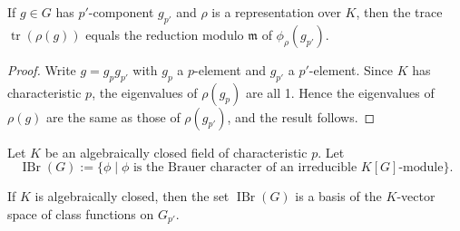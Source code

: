 \begin{lemma}\label{tr_Bcha}
If \(g \in G\) has \(p'\)-component \(g_{p'}\) and \(\rho\) is a representation over \(K\), then the trace \(\operatorname{tr}(\rho(g))\) equals the reduction modulo \(\mathfrak{m}\) of \(\phi_\rho(g_{p'})\).
\end{lemma}

\begin{proof}
Write \(g = g_p g_{p'}\) with \(g_p\) a \(p\)-element and \(g_{p'}\) a \(p'\)-element. Since \(K\) has characteristic \(p\), the eigenvalues of \(\rho(g_p)\) are all 1. Hence the eigenvalues of \(\rho(g)\) are the same as those of \(\rho(g_{p'})\), and the result follows.
\end{proof}


\begin{defn}
Let \(K\) be an algebraically closed field of characteristic \(p\). Let
\[
\operatorname{IBr}(G) := \{ \phi \mid \phi \text{ is the Brauer character of an irreducible } K[G]\text{-module} \}.
\]
\end{defn}

\begin{thm}[Brauer]\label{thm:Brauer basis}
If \(K\) is algebraically closed, then the set \(\operatorname{IBr}(G)\) is a basis of the \(K\)-vector space of class functions on \(G_{p'}\).
\end{thm}

